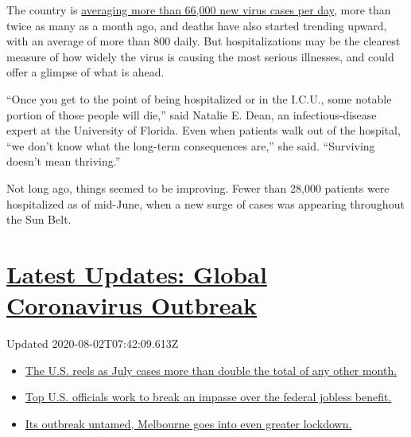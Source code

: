 The country is
\href{https://www.nytimes.com/interactive/2020/us/coronavirus-us-cases.html}{averaging
more than 66,000 new virus cases per day}, more than twice as many as a
month ago, and deaths have also started trending upward, with an average
of more than 800 daily. But hospitalizations may be the clearest measure
of how widely the virus is causing the most serious illnesses, and could
offer a glimpse of what is ahead.

``Once you get to the point of being hospitalized or in the I.C.U., some
notable portion of those people will die,'' said Natalie E. Dean, an
infectious-disease expert at the University of Florida. Even when
patients walk out of the hospital, ``we don't know what the long-term
consequences are,'' she said. ``Surviving doesn't mean thriving.''

Not long ago, things seemed to be improving. Fewer than 28,000 patients
were hospitalized as of mid-June, when a new surge of cases was
appearing throughout the Sun Belt.

\hypertarget{latest-updates-global-coronavirus-outbreak}{%
\section{\texorpdfstring{\href{https://www.nytimes.com/2020/08/01/world/coronavirus-covid-19.html?action=click\&pgtype=Article\&state=default\&region=MAIN_CONTENT_1\&context=storylines_live_updates}{Latest
Updates: Global Coronavirus
Outbreak}}{Latest Updates: Global Coronavirus Outbreak}}\label{latest-updates-global-coronavirus-outbreak}}

Updated 2020-08-02T07:42:09.613Z

\begin{itemize}
\tightlist
\item
  \href{https://www.nytimes.com/2020/08/01/world/coronavirus-covid-19.html?action=click\&pgtype=Article\&state=default\&region=MAIN_CONTENT_1\&context=storylines_live_updates\#link-34047410}{The
  U.S. reels as July cases more than double the total of any other
  month.}
\item
  \href{https://www.nytimes.com/2020/08/01/world/coronavirus-covid-19.html?action=click\&pgtype=Article\&state=default\&region=MAIN_CONTENT_1\&context=storylines_live_updates\#link-780ec966}{Top
  U.S. officials work to break an impasse over the federal jobless
  benefit.}
\item
  \href{https://www.nytimes.com/2020/08/01/world/coronavirus-covid-19.html?action=click\&pgtype=Article\&state=default\&region=MAIN_CONTENT_1\&context=storylines_live_updates\#link-2bc8948}{Its
  outbreak untamed, Melbourne goes into even greater lockdown.}
\end{itemize}

